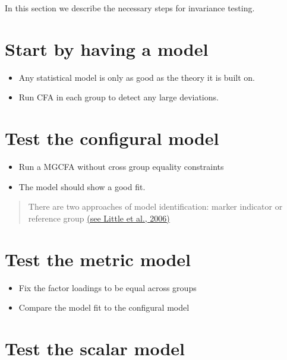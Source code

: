 \documentclass[
]{book}
\begin{document}
In this section we describe the necessary steps for invariance testing.

\hypertarget{start-by-having-a-model}{%
\section{Start by having a model}\label{start-by-having-a-model}}

\begin{itemize}
\item
  Any statistical model is only as good as the theory it is built on.
\item
  Run CFA in each group to detect any large deviations.
\end{itemize}

\hypertarget{test-the-configural-model}{%
\section{Test the configural model}\label{test-the-configural-model}}

\begin{itemize}
\item
  Run a MGCFA without cross group equality constraints
\item
  The model should show a good fit.
\end{itemize}

\begin{quote}
There are two approaches of model identification: marker indicator or reference group
\href{https://www.tandfonline.com/doi/abs/10.1207/s15328007sem1301_3}{(see Little et al., 2006)}
\end{quote}

\hypertarget{test-the-metric-model}{%
\section{Test the metric model}\label{test-the-metric-model}}

\begin{itemize}
\item
  Fix the factor loadings to be equal across groups
\item
  Compare the model fit to the configural model
\end{itemize}

\hypertarget{test-the-scalar-model}{%
\section{Test the scalar model}\label{test-the-scalar-model}}
\end{document}
